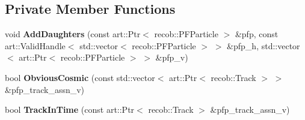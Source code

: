 \subsection*{Private Member Functions}
\begin{DoxyCompactItemize}
\item 
\hypertarget{classCosmicRejection_a3d08aca297afc5331fdbab328b356137}{void {\bfseries Add\-Daughters} (const art\-::\-Ptr$<$ recob\-::\-P\-F\-Particle $>$ \&pfp, const art\-::\-Valid\-Handle$<$ std\-::vector$<$ recob\-::\-P\-F\-Particle $>$ $>$ \&pfp\-\_\-h, std\-::vector$<$ art\-::\-Ptr$<$ recob\-::\-P\-F\-Particle $>$ $>$ \&pfp\-\_\-v)}\label{classCosmicRejection_a3d08aca297afc5331fdbab328b356137}

\item 
\hypertarget{classCosmicRejection_afc2a715c5cf89aa6c20faebe5b5f7119}{bool {\bfseries Obvious\-Cosmic} (const std\-::vector$<$ art\-::\-Ptr$<$ recob\-::\-Track $>$ $>$ \&pfp\-\_\-track\-\_\-assn\-\_\-v)}\label{classCosmicRejection_afc2a715c5cf89aa6c20faebe5b5f7119}

\item 
\hypertarget{classCosmicRejection_a1538163eeb6a0ed22f6bba844952f1f0}{bool {\bfseries Track\-In\-Time} (const art\-::\-Ptr$<$ recob\-::\-Track $>$ \&pfp\-\_\-track\-\_\-assn\-\_\-v)}\label{classCosmicRejection_a1538163eeb6a0ed22f6bba844952f1f0}

\end{DoxyCompactItemize}
